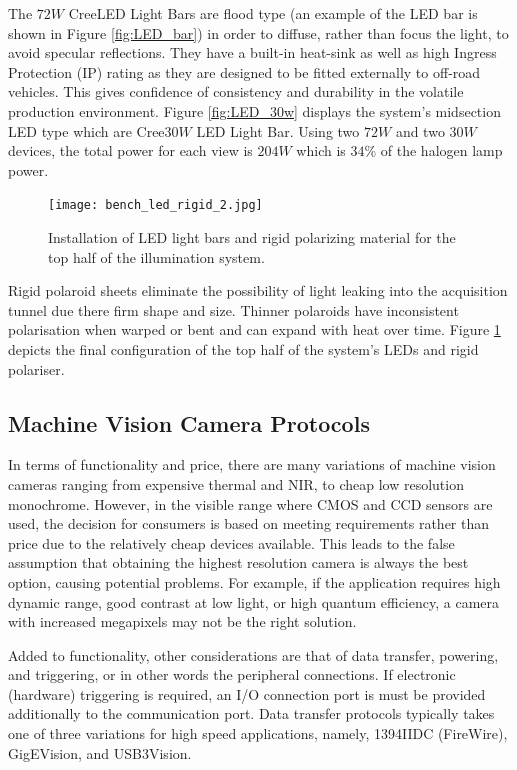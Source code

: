 \documentclass[fleqn,twoside,12pt]{report}
\begin{document}
The $72W$ Cree\textregistered LED Light Bars are flood type (an example of the LED bar is shown in Figure \ref{fig:LED_bar}) in order to diffuse, rather than focus the light, to avoid specular reflections. They have a built-in heat-sink as well as high Ingress Protection (IP) rating as they are designed to be fitted externally to off-road vehicles. This gives confidence of consistency and durability in the volatile production environment. Figure \ref{fig:LED_30w} displays the system's midsection LED type which are Cree\textregistered $30W$ LED Light Bar. Using two $72W$ and two $30W$ devices, the total power for each view is $204W$ which is $34\%$ of the halogen lamp power.



\begin{figure}[h]
	\centering
	\texttt{[image: bench\_led\_rigid\_2.jpg]}
	\caption{Installation of LED light bars and rigid polarizing material for the top half of the illumination system.}
	\label{fig:bench_led_rigid}
\end{figure}%

Rigid polaroid sheets eliminate the possibility of light leaking into the acquisition tunnel due there firm shape and size. Thinner polaroids have inconsistent polarisation when warped or bent and can expand with heat over time. Figure \ref{fig:bench_led_rigid} depicts the final configuration of the top half of the system's LEDs and rigid polariser.



\subsection{Machine Vision Camera Protocols}


In terms of functionality and price, there are many variations of machine vision cameras ranging from expensive thermal and NIR, to cheap low resolution monochrome. However, in the visible range where CMOS and CCD sensors are used, the decision for consumers is based on meeting requirements rather than price due to the relatively cheap devices available. This leads to the false assumption that obtaining the highest resolution camera is always the best option, causing potential problems. For example, if the application requires high dynamic range, good contrast at low light, or high quantum efficiency, a camera with increased megapixels may not be the right solution.

Added to functionality, other considerations are that of data transfer, powering, and triggering, or in other words the peripheral connections. If electronic (hardware) triggering is required, an I/O connection port is must be provided additionally to the communication port. Data transfer protocols typically takes one of three variations for high speed applications, namely, 1394IIDC (FireWire\texttrademark), GigEVision\textregistered, and USB3Vision\textregistered. 
\end{document}
